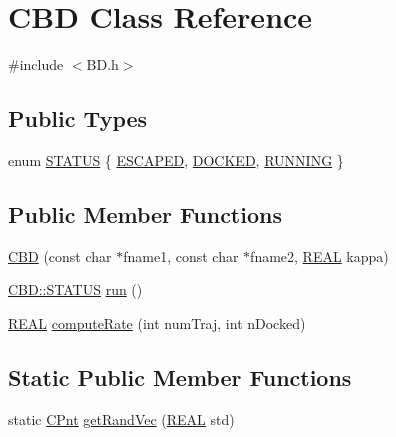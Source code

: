 \hypertarget{classCBD}{\section{C\-B\-D Class Reference}
\label{classCBD}
}


{\ttfamily \#include $<$B\-D.\-h$>$}

\subsection*{Public Types}
\begin{DoxyCompactItemize}
\item 
enum \hyperlink{classCBD_ad133262cc326c96e755511655e632e57}{S\-T\-A\-T\-U\-S} \{ \hyperlink{classCBD_ad133262cc326c96e755511655e632e57a1a1bdce13ca045bee400064ec75a4ab7}{E\-S\-C\-A\-P\-E\-D}, 
\hyperlink{classCBD_ad133262cc326c96e755511655e632e57ac0a9f8a84559135662cf71c4893a99ef}{D\-O\-C\-K\-E\-D}, 
\hyperlink{classCBD_ad133262cc326c96e755511655e632e57a4ba124eb7b8e8a8c32491bc599f62851}{R\-U\-N\-N\-I\-N\-G}
 \}
\end{DoxyCompactItemize}
\subsection*{Public Member Functions}
\begin{DoxyCompactItemize}
\item 
\hyperlink{classCBD_a9594e15571fc17a65dc1dbe8a0532971}{C\-B\-D} (const char $\ast$fname1, const char $\ast$fname2, \hyperlink{util_8h_a5821460e95a0800cf9f24c38915cbbde}{R\-E\-A\-L} kappa)
\item 
\hyperlink{classCBD_ad133262cc326c96e755511655e632e57}{C\-B\-D\-::\-S\-T\-A\-T\-U\-S} \hyperlink{classCBD_a0e59f17fc428ea28a8c8b4c9656a3538}{run} ()
\item 
\hyperlink{util_8h_a5821460e95a0800cf9f24c38915cbbde}{R\-E\-A\-L} \hyperlink{classCBD_afa41f280cb3eeb206e6e7c7e99332726}{compute\-Rate} (int num\-Traj, int n\-Docked)
\end{DoxyCompactItemize}
\subsection*{Static Public Member Functions}
\begin{DoxyCompactItemize}
\item 
static \hyperlink{classCPnt}{C\-Pnt} \hyperlink{classCBD_a9ad6f87e7436fa716a470e97f0ec836f}{get\-Rand\-Vec} (\hyperlink{util_8h_a5821460e95a0800cf9f24c38915cbbde}{R\-E\-A\-L} std)
\end{DoxyCompactItemize}
